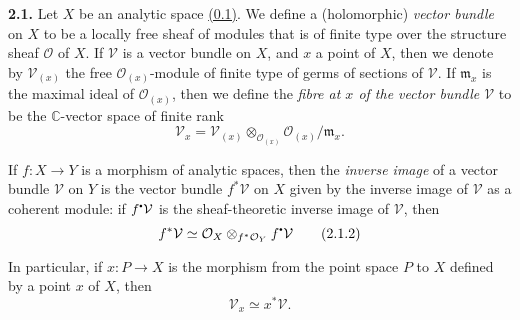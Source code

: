 \documentclass{report}
\newenvironment{rmenv}[1]
  {\phantomsection\par\medskip\noindent\textbf{#1.}\rmfamily}
  {\par\medskip}
\renewcommand{\cal}[1]{{\mathcal{#1}}}
\newcommand{\sbullet}{{\mathbin{\vcenter{\hbox{\scalebox{.5}{$\bullet$}}}}}}
\newcommand{\CC}{\mathbb{C}}
\newcommand{\oldpage}[1]{\marginpar{\footnotesize$\Big\vert$ \textit{p.~#1}}}
\begin{document}
\oldpage{5}

\begin{rmenv}{2.1}
  Let $X$ be an analytic space \hyperref[0.1]{(0.1)}.
  We define a (holomorphic) \emph{vector bundle} on $X$ to be a locally free sheaf of modules that is of finite type over the structure sheaf $\cal{O}$ of $X$.
  If $\cal{V}$ is a vector bundle on $X$, and $x$ a point of $X$, then we denote by $\cal{V}_{(x)}$ the free $\cal{O}_{(x)}$-module of finite type of germs of sections of $\cal{V}$.
  If $\mathfrak{m}_x$ is the maximal ideal of $\cal{O}_{(x)}$, then we define the \emph{fibre at $x$ of the vector bundle $\cal{V}$} to be the $\CC$-vector space of finite rank
  \[
  \label{I.2.1.1}
    \cal{V}_x = \cal{V}_{(x)} \otimes_{\cal{O}_{(x)}} \cal{O}_{(x)}/\mathfrak{m}_x.
  \tag{2.1.1}
  \]

  If $f\colon X\to Y$ is a morphism of analytic spaces, then the \emph{inverse image} of a vector bundle $\cal{V}$ on $Y$ is the vector bundle $f^*\cal{V}$ on $X$ given by the inverse image of $\cal{V}$ as a coherent module:
  if $f^\sbullet\cal{V}$ is the sheaf-theoretic inverse image of $\cal{V}$, then
  \[
  \label{I.2.1.2}
    f^*\cal{V} \simeq \cal{O}_X \otimes_{f^*\cal{O}_Y} f^\sbullet\cal{V}
  \tag{2.1.2}
  \]

  In particular, if $x\colon P\to X$ is the morphism from the point space $P$ to $X$ defined by a point $x$ of $X$, then
  \[
    \label{I.2.1.3}
      \cal{V}_x \simeq x^*\cal{V}.
    \tag{2.1.3}
  \]
\end{rmenv}
\end{document}
